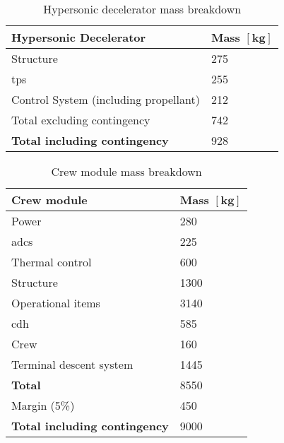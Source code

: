 \begin{table}[H]
\begin{tabular}{|p{}|p{}|}
		
	\end{tabular}
\end{table}

\begin{table}[H]
	\centering
	\caption{Hypersonic decelerator mass breakdown}
	\label{tab:DeceleratorMass}
	\begin{tabular}{|p{}|p{}|} \hline
		\textbf {Hypersonic Decelerator}             & \textbf{Mass $\mathbf{[kg]}$ } \\ \hline \hline
		Structure          &		 275       \\ \hline
		\acrlong{tps} &		  255      \\ \hline
		Control System (including propellant) 		   &  212      \\ \hline \hline
		Total excluding contingency              	   &  742     \\ \hline
		\textbf {Total including contingency}                 &  928      \\ \hline
	\end{tabular}
\end{table}

\begin{table}[H]
	\centering
	\caption{Crew module mass breakdown}
	\label{tab:CrewModuleMass}
	\begin{tabular}{|p{}|p{}|} \hline
		\textbf {Crew module}             & \textbf{Mass $\mathbf{[kg]}$ } \\ \hline \hline
		Power        &		 280       \\ \hline
		\gls{adcs} &		  225      \\ \hline
		Thermal control & 600\\ \hline
		Structure & 1300\\ \hline
		Operational items & 3140\\ \hline
		\acrlong{cdh} & 585 \\ \hline
		Crew & 160 \\ \hline
		Terminal descent system           		   &  1445      \\ \hline \hline
		\textbf{Total}             	   &  8550     \\ \hline
		Margin (5\%) & 450							\\ \hline
		\textbf {Total including contingency}                 &  9000      \\ \hline
	\end{tabular}
\end{table}

